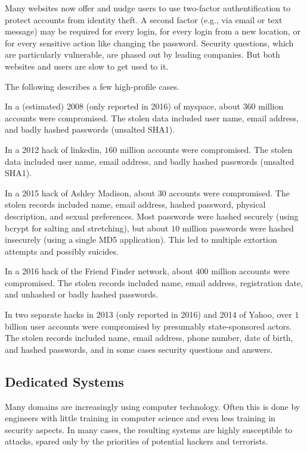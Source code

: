 Many websites now offer and nudge users to use two-factor authentification to protect accounts from identity theft.
A second factor (e.g., via email or text message) may be required for every login, for every login from a new location, or for every sensitive action like changing the password.
Security questions, which are particularly vulnerable, are phased out by leading companies.
But both websites and users are slow to get used to it.
\medskip

The following describes a few high-profile cases.

In a (estimated) 2008 (only reported in 2016) of myspace, about $360$ million accounts were compromised.
The stolen data included user name, email address, and badly hashed passwords (unsalted SHA1).

In a 2012 hack of linkedin, $160$ million accounts were compromised.
The stolen data included user name, email address, and badly hashed passwords (unsalted SHA1).

In a 2015 hack of Ashley Madison, about $30$ accounts were compromised.
The stolen records included name, email address, hashed password, physical description, and sexual preferences.
Most passwords were hashed securely (using bcrypt for salting and stretching), but about $10$ million passwords were hashed insecurely (using a single MD5 application).
This led to multiple extortion attempts and possibly suicides.

In a 2016 hack of the Friend Finder network, about $400$ million accounts were compromised.
The stolen records included name, email address, registration date, and unhashed or badly hashed passwords.

In two separate hacks in 2013 (only reported in 2016) and 2014 of Yahoo, over $1$ billion user accounts were compromised by presumably state-sponsored actors.
The stolen records included name, email address, phone number, date of birth, and hashed passwords, and in some cases security questions and answers.

\subsection{Dedicated Systems}

Many domains are increasingly using computer technology.
Often this is done by engineers with little training in computer science and even less training in security aspects.
In many cases, the resulting systems are highly susceptible to attacks, spared only by the priorities of potential hackers and terrorists.

